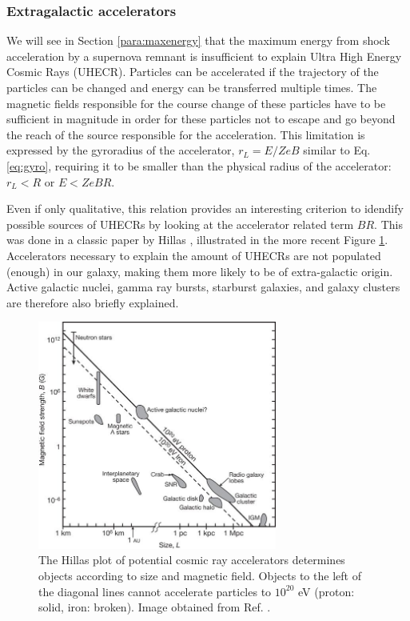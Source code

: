 \subsubsection{Extragalactic accelerators}
We will see in Section \ref{para:maxenergy} that the maximum energy from shock acceleration by a supernova remnant is insufficient to explain Ultra High Energy Cosmic Rays (UHECR). Particles can be accelerated if the trajectory of the particles can be changed and energy can be transferred multiple times. The magnetic fields responsible for the course change of these particles have to be sufficient in magnitude in order for these particles not to escape and go beyond the reach of the source responsible for the acceleration. This limitation is expressed by the gyroradius of the accelerator, $r_L = E/ZeB$ similar to Eq. \ref{eq:gyro}, requiring it to be smaller than the physical radius of the accelerator: $r_L < R$ or $E < ZeBR$.

Even if only qualitative, this relation provides an interesting criterion to idendify possible sources of UHECRs by looking at the accelerator related term $BR$. This was done in a classic paper by Hillas \cite{Hillas:1985is}, illustrated in the more recent Figure \ref{fig:hillas}. Accelerators necessary to explain the amount of UHECRs are not populated (enough) in our galaxy, making them more likely to be of extra-galactic origin. Active galactic nuclei, gamma ray bursts, starburst galaxies, and galaxy clusters are therefore also briefly explained.

\begin{figure}
\centering
\includegraphics[width = 0.7\textwidth]{chapter3/img/Hillas.jpg}
\caption{The Hillas plot of potential cosmic ray accelerators determines objects according to size and magnetic field. Objects to the left of the diagonal lines cannot accelerate particles to $10^{20}$ eV (proton: solid, iron: broken). Image obtained from Ref. \cite{Bauleo:2009zz}.}
\label{fig:hillas}
\end{figure}



